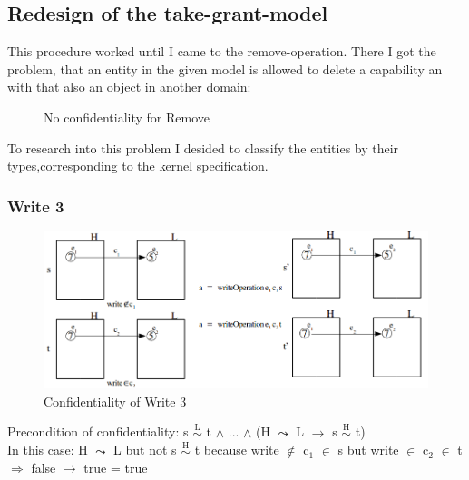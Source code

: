 \documentclass[pdftex,11pt,a4paper]{article}
\begin{document}
\subsection{Redesign of the take-grant-model}
This procedure worked until I came to the remove-operation. There I got the problem, that an entity in the given model is allowed to delete a capability an with that also an object in another domain:
\begin{figure}[H]
\caption{No confidentiality for Remove}
\end{figure}
To research into this problem I desided to classify the entities by their types,corresponding to the kernel specification. 
\subsubsection{Write 3}\label{sec:Write 3}
\begin{figure}[H]
	\includegraphics[width=1.1\textwidth]{./Pictures/write3Confidentality.png}
		\caption[Confidentiality of Write 3]{Confidentiality of Write 3}
	\label{fig:write3}
\end{figure}
Precondition of confidentiality: 	s $\overset{\text{L}}{\sim}$ t $\wedge$ ... $\wedge$ (H  $\leadsto$ L $\rightarrow$ s $\overset{\text{H}}{\sim}$ t) \\
In this case: H  $\leadsto$ L but not s $\overset{\text{H}}{\sim}$ t because write $\notin$ c$_1$ $\in$ s but write $\in$ c$_2$ $\in$ t \\
$\Rightarrow$ false $\rightarrow$ true = true
\end{document}
